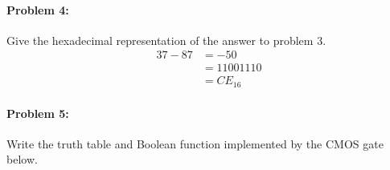 \documentclass[12pt,letterpaper,titlepage]{article}
\begin{document}
\begin{raggedright}
\begin{paracol}{2}
\paragraph{Problem 4: }
Give the hexadecimal representation of the answer to problem 3.
\begin{align*}
37-87 	&= -50
\\		&= 1100 1110
\\		&= CE_{16}
\end{align*}
\end{paracol} 
\paragraph{Problem 5: }
Write the truth table and Boolean function implemented by the CMOS gate below.
\begin{center}
\begin{paracol}{3}

\end{paracol}
\end{center}
\end{raggedright}
\end{document}
